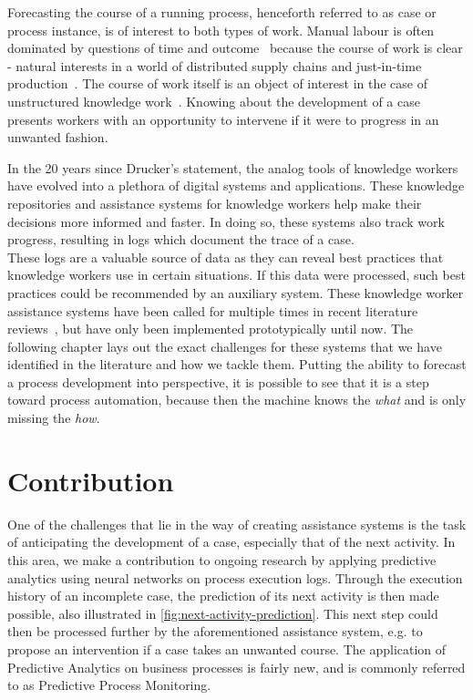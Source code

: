 Forecasting the course of a running process, henceforth referred to as case or process instance, is of interest to both types of work. Manual labour is often dominated by questions of time and outcome~\cite{rogge2013} because the course of work is clear - natural interests in a world of distributed supply chains and just-in-time production~\cite{web:economist:jit}. The course of work itself is an object of interest in the case of unstructured knowledge work~\cite{francescomarino2015}. Knowing about the development of a case presents workers with an opportunity to intervene if it were to progress in an unwanted fashion.

In the 20 years since Drucker's statement, the analog tools of knowledge workers have evolved into a plethora of digital systems and applications. These knowledge repositories and assistance systems for knowledge workers help make their decisions more informed and faster. In doing so, these systems also track work progress, resulting in logs which document the trace of a case.\\

These logs are a valuable source of data as they can reveal best practices that knowledge workers use in certain situations. If this data were processed, such best practices could be recommended by an auxiliary system. These knowledge worker assistance systems have been called for multiple times in recent literature reviews~\cite{hauder2014, francescomarino2018}, but have only been implemented prototypically until now. The following chapter lays out the exact challenges for these systems that we have identified in the literature and how we tackle them. Putting the ability to forecast a process development into perspective, it is possible to see that it is a step toward process automation, because then the machine knows the \textit{what} and is only missing the \textit{how}.

\section{Contribution}\label{sec:intro:contribution}
One of the challenges that lie in the way of creating assistance systems is the task of anticipating the development of a case, especially that of the next activity. In this area, we make a contribution to ongoing research by applying predictive analytics using neural networks on process execution logs. Through the execution history of an incomplete case, the prediction of its next activity is then made possible, also illustrated in \autoref{fig:next-activity-prediction}. This next step could then be processed further by the aforementioned assistance system, e.g. to propose an intervention if a case takes an unwanted course. The application of Predictive Analytics on business processes is fairly new, and is commonly referred to as Predictive Process Monitoring.\\

